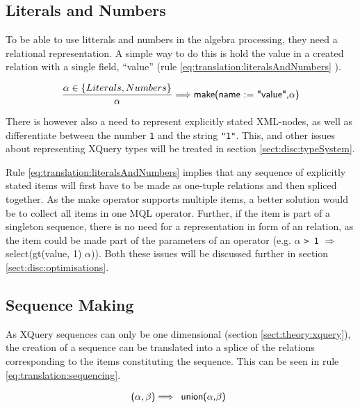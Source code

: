 \subsection{Literals and Numbers}
\label{sect:translation:mXr:litAndNumbers}
To be able to use litterals and numbers in the algebra processing, they need a
relational representation. A simple way to do this is hold the value in a
created relation with a single field, ``value'' (rule
\ref{eq:translation:literalsAndNumbers} ).

\begin{equation}
\centering
\frac{\alpha \in \left\{ Literals, Numbers \right\} }{\alpha}
\Longrightarrow
\textsf{make(name := "value",} \alpha \textsf{)}
\label{eq:translation:literalsAndNumbers}
\end{equation}

There is however also a need to represent explicitly stated XML-nodes, as well
as differentiate between the number \texttt{1} and the string \texttt{"1"}.
This, and other issues about representing XQuery types will be treated in
section \ref{sect:disc:typeSystem}.

Rule \ref{eq:translation:literalsAndNumbers} implies that any sequence of
explicitly stated items will first have to be made as one-tuple relations and
then spliced together. As the \textsf{make} operator supports multiple items, a
better solution would be to collect all items in one MQL operator. Further, if
the item is part of a singleton sequence, there is no need for a representation
in form of an relation, as the item could be made part of the parameters of an
operator (e.g. $\alpha$ \texttt{> 1} $\Longrightarrow$
\textsf{select(gt(value, 1) $\alpha$)}). Both these issues will be discussed
further in section \ref{sect:disc:optimisations}.



\subsection{Sequence Making}
\label{sect:translation:mXr:sequencing}
As XQuery sequences can only be one dimensional (section
\ref{sect:theory:xquery}), the creation of a sequence can be translated into a
splice of the relations corresponding to the items constituting the sequence.
This can be seen in rule \ref{eq:translation:sequencing}. 

\begin{equation}
\centering
\textsf{(} \alpha , \beta \textsf{)}
\Longrightarrow
\begin{array}{l}
\mbox{\textsf{union(}} 
\alpha \mbox{\textsf{,}} 
\beta \mbox{\textsf{)}}
\end{array}
\label{eq:translation:sequencing}
\end{equation}


